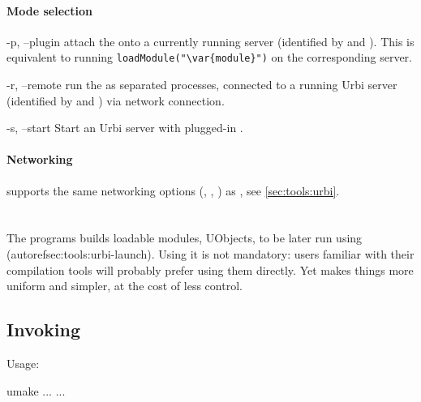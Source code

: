 \paragraph{Mode selection}
\begin{options}
\item[-p, --plugin] attach the  onto a currently running
  \urbi server (identified by  and ).  This is
  equivalent to running \lstinline|loadModule("\var{module}")| on the
  corresponding server.

\item[-r, --remote] run the  as separated processes,
  connected to a running Urbi server (identified by  and
  ) via network connection.

\item[-s, --start] Start an Urbi server with plugged-in .
\end{options}

\paragraph{Networking}
 supports the same networking options
(, , ) as
, see \autoref{sec:tools:urbi}.


\section{}
\label{sec:tools:umake}

The  programs builds loadable modules, UObjects, to be
later run using 
(autoref{sec:tools:urbi-launch}).  Using it is not mandatory: users
familiar with their compilation tools will probably prefer using them
directly.  Yet  makes things more uniform and simpler,
at the cost of less control.

\subsection{Invoking }
\label{sec:tools:umake:invoke}

Usage:
\begin{shell}
umake ... ...
\end{shell}

